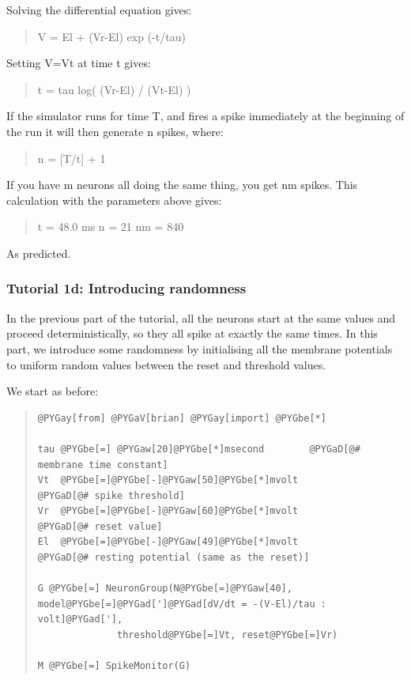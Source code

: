 \documentclass[letterpaper,10pt,english]{manual}
\begin{document}
Solving the differential equation gives:
\begin{quote}

V = El + (Vr-El) exp (-t/tau)
\end{quote}

Setting V=Vt at time t gives:
\begin{quote}

t = tau log( (Vr-El) / (Vt-El) )
\end{quote}

If the simulator runs for time T, and fires a spike immediately
at the beginning of the run it will then generate n spikes,
where:
\begin{quote}

n = {[}T/t{]} + 1
\end{quote}

If you have m neurons all doing the same thing, you get nm
spikes. This calculation with the parameters above gives:
\begin{quote}

t = 48.0 ms
n = 21
nm = 840
\end{quote}

As predicted.

\resetcurrentobjects


\subsubsection{Tutorial 1d: Introducing randomness}

In the previous part of the tutorial, all the neurons start
at the same values and proceed deterministically, so they all
spike at exactly the same times. In this part, we introduce
some randomness by initialising all the membrane potentials
to uniform random values between the reset and threshold
values.

We start as before:
\begin{quote}

\begin{Verbatim}[commandchars=@\[\]]
@PYGay[from] @PYGaV[brian] @PYGay[import] @PYGbe[*]

tau @PYGbe[=] @PYGaw[20]@PYGbe[*]msecond        @PYGaD[@# membrane time constant]
Vt  @PYGbe[=]@PYGbe[-]@PYGaw[50]@PYGbe[*]mvolt          @PYGaD[@# spike threshold]
Vr  @PYGbe[=]@PYGbe[-]@PYGaw[60]@PYGbe[*]mvolt          @PYGaD[@# reset value]
El  @PYGbe[=]@PYGbe[-]@PYGaw[49]@PYGbe[*]mvolt          @PYGaD[@# resting potential (same as the reset)]

G @PYGbe[=] NeuronGroup(N@PYGbe[=]@PYGaw[40], model@PYGbe[=]@PYGad[']@PYGad[dV/dt = -(V-El)/tau : volt]@PYGad['],
              threshold@PYGbe[=]Vt, reset@PYGbe[=]Vr)

M @PYGbe[=] SpikeMonitor(G)
\end{Verbatim}
\end{quote}
\end{document}
